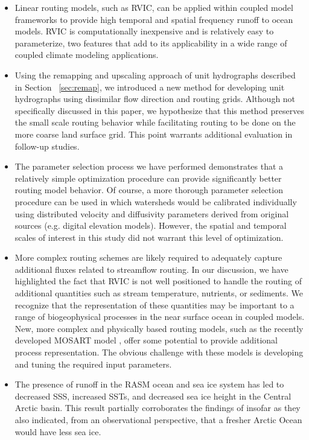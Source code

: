 \documentclass[jgrga, draft]{agutex}
\begin{document}
\begin{article}
\begin{itemize}[leftmargin=+.5in]
\begin{itemize}[leftmargin=+.5in]
\begin{itemize}[leftmargin=+.5in]
\item Linear routing models, such as RVIC, can be applied within coupled model frameworks to provide high temporal and spatial frequency runoff to ocean models.
RVIC is computationally inexpensive and is relatively easy to parameterize, two features that add to its applicability in a wide range of coupled climate modeling applications.
\item Using the remapping and upscaling approach of unit hydrographs described in Section ~\ref{sec:remap}, we introduced a new method for developing unit hydrographs using dissimilar flow direction and routing grids.
Although not specifically discussed in this paper, we hypothesize that this method preserves the small scale routing behavior while facilitating routing to be done on the more coarse land surface grid. %
This point warrants additional evaluation in follow-up studies.
\item The parameter selection process we have performed demonstrates that a relatively simple optimization procedure can provide significantly better routing model behavior.
Of course, a more thorough parameter selection procedure can be used in which  watersheds would be calibrated individually using distributed velocity and diffusivity parameters derived from original sources (e.g. digital elevation models).
However, the spatial and temporal scales of interest in this study did not warrant this level of optimization.
\item More complex routing schemes are likely required to adequately capture additional fluxes related to streamflow routing.
In our discussion, we have highlighted the fact that RVIC is not well positioned to handle the routing of additional quantities such as stream temperature, nutrients, or sediments.
We recognize that the representation of these quantities may be important to a range of biogeophysical processes in the near surface ocean in coupled models.
New, more complex and physically based routing models, such as the recently developed MOSART model \citep{Li_2013}, offer some potential to provide additional process representation.
The obvious challenge with these models is developing and tuning the required input parameters.
\item The presence of runoff in the RASM ocean and sea ice system has led to decreased SSS, increased SSTs, and decreased sea ice height in the Central Arctic basin.
This result partially corroborates the findings of \citep{Morison_2012} insofar as they also indicated, from an observational perspective, that a fresher Arctic Ocean would have less sea ice. %


\end{itemize}
\end{itemize}
\end{itemize}
\end{article}
\end{document}
